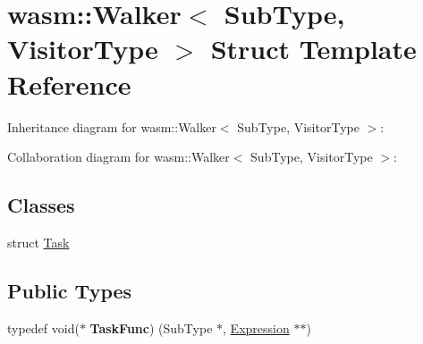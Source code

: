 \hypertarget{structwasm_1_1_walker}{}\section{wasm\+:\+:Walker$<$ Sub\+Type, Visitor\+Type $>$ Struct Template Reference}
\label{structwasm_1_1_walker}


Inheritance diagram for wasm\+:\+:Walker$<$ Sub\+Type, Visitor\+Type $>$\+:


Collaboration diagram for wasm\+:\+:Walker$<$ Sub\+Type, Visitor\+Type $>$\+:
\subsection*{Classes}
\begin{DoxyCompactItemize}
\item 
struct \mbox{\hyperlink{structwasm_1_1_walker_1_1_task}{Task}}
\end{DoxyCompactItemize}
\subsection*{Public Types}
\begin{DoxyCompactItemize}
\item 
\mbox{\label{structwasm_1_1_walker_adfdfea4210a6022d03c6d551de965c11}} 
typedef void($\ast$ {\bfseries Task\+Func}) (Sub\+Type $\ast$, \mbox{\hyperlink{classwasm_1_1_expression}{Expression}} $\ast$$\ast$)
\end{DoxyCompactItemize}

